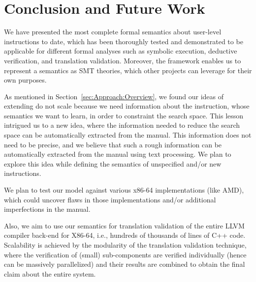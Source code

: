 \section{Conclusion and Future Work}\label{sec:conc}

We have presented the most complete formal semantics about \ISA user-level instructions
to date, which has been thoroughly tested and demonstrated  to be applicable
for different formal analyses such as symbolic execution, deductive
verification, and translation validation.
Moreover, the \K framework enables us to represent a semantics as SMT theories,
which other projects can
leverage for their own purposes.

As mentioned in Section~\ref{sec:Approach:Overview}, we found our ideas of extending \Strata do not scale because we need information about the instruction, whose semantics we want to learn, in order to constraint the search space. This lesson intrigued us to a new idea, where the information needed to reduce the search space can be automatically extracted from the manual. This  information does not need to be precise, and we believe that such a rough information can be automatically extracted from the manual using text processing.  We plan to explore this idea while defining the semantics of unspecified and/or new instructions.

We plan to test our model against various x86-64 implementations (like AMD), which could uncover flaws in those implementations and/or additional imperfections in the manual.

Also, we aim to use our semantics for translation validation of the entire LLVM compiler back-end for X86-64, i.e., hundreds of thousands of lines of C++ code. Scalability is achieved by the modularity of the translation validation technique, where the verification of (small) sub-components are verified individually (hence can be massively parallelized) and their results are combined to obtain the final claim about the entire system.

 


   
